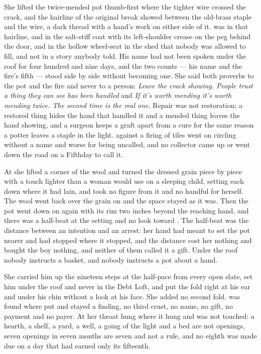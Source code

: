 She lifted the twice-mended pot thumb-first where the tighter wire crossed the crack, and the hairline of the original break showed between the old-brass staple and the wire, a dark thread with a hand's work on either side of it.  was in that hairline, and in the salt-stiff coat with its left-shoulder crease on the peg behind the door, and in the hollow wheel-seat in the shed that nobody was allowed to fill, and not in a story anybody told. His name had not been spoken under the roof for four hundred and nine days, and the two counts --- his name and the fire's fifth --- stood side by side without becoming one. She said both proverbs to the pot and the fire and never to a person: \emph{Leave the crack showing. People trust a thing they can see has been handled} and \emph{If it's worth mending it's worth mending twice. The second time is the real one}. Repair was not restoration; a restored thing hides the hand that handled it and a mended thing leaves the hand showing, and a surgeon keeps a graft apart from a cure for the same reason a potter leaves a staple in the light.  against a firing of tiles went on circling without a name and worse for being uncalled, and no collector came up or went down the road on a Fifthday to call it.

At  she lifted a corner of the wool and turned the dressed grain piece by piece with a touch lighter than a woman would use on a sleeping child, setting each down where it had lain, and took no figure from it and no handful for herself. The wool went back over the grain on  and the space stayed as it was. Then the pot went down on  again with its rim two inches beyond the reaching hand, and there was a half-beat at the setting and no look toward . The half-beat was the distance between an intention and an arrest: her hand had meant to set the pot nearer and had stopped where it stopped, and the distance cost her nothing and bought the boy nothing, and neither of them called it a gift. Under the roof nobody instructs a basket, and nobody instructs a pot about a hand.

She carried him up the nineteen steps at the half-pace from every open slate, set him under the roof and never in the Debt Loft, and put the fold right at his ear and under his chin without a look at his face. She added no second fold.  was found where put and stayed a finding, no third crust, no name, no gift, no payment and no payer. At her throat  hung where it hung and was not touched: a hearth, a shelf, a yard, a well, a going of the light and a bed are not openings, seven openings in seven months are seven and not a rule, and no eighth was made due on a day that had earned only its fifteenth.


